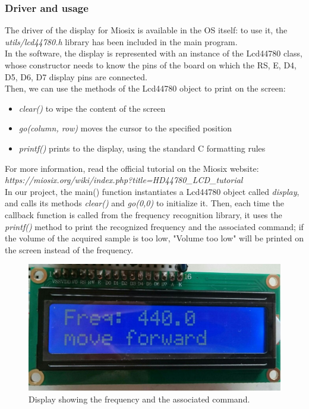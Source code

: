 \subsubsection{Driver and usage}
The driver of the display for Miosix is available in the OS itself: to use it, the \textit{utils/lcd44780.h} library has been included in the main program. \\
 In the software, the display is represented with an instance of the Lcd44780 class, whose constructor needs to know the pins of the board on which the RS, E, D4, D5, D6, D7 display pins are connected. \\
 Then, we can use the methods of the Lcd44780 object to print on the screen:
 \begin{itemize}
 	\item \textit{clear()} to wipe the content of the screen
 	\item \textit{go(column, row)} moves the cursor to the specified position
 	\item \textit{printf()} prints to the display, using the standard C formatting rules
 \end{itemize}
For more information, read the official tutorial on the Miosix website: \\ \textit{https://miosix.org/wiki/index.php?title=HD44780\_LCD\_tutorial}\\

In our project, the main() function instantiates a Lcd44780 object called \textit{display}, and calls its methods \textit{clear()} and \textit{go(0,0)} to initialize it.
Then, each time the callback function is called from the frequency recognition library, it uses the \textit{printf()} method to print the recognized frequency and the associated command; if the volume of the acquired sample is too low, "Volume too low" will be printed on the screen instead of the frequency.

\begin{figure}[H]
	\centering
	\includegraphics[width=\textwidth]
	{files/images/display_on.jpg}
	\caption{Display showing the frequency and the associated command.}
\end{figure}
